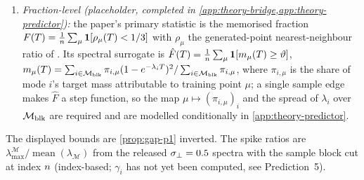 \begin{definition}
\begin{enumerate}
\item[(iii)] \emph{Fraction-level (placeholder, completed in \cref{app:theory-bridge,app:theory-predictor}):} the paper's primary statistic is the memorised fraction $F(T)=\tfrac1{n}\sum_\mu\mathbf 1[\rho_\mu(T)<1/3]$ with $\rho_\mu$ the generated-point nearest-neighbour ratio of \citet{bonnaire2025}. Its spectral surrogate is $\hat F(T)=\tfrac1{n}\sum_\mu\mathbf 1[m_\mu(T)\ge\vartheta]$, $m_\mu(T)=\sum_{i\in\mathcal M_{\rm blk}}\pi_{i,\mu}(1-e^{-\lambda_iT})^2/\sum_{i\in\mathcal M_{\rm blk}}\pi_{i,\mu}$, where $\pi_{i,\mu}$ is the share of mode $i$'s target mass attributable to training point $\mu$; a single sample edge makes $\hat F$ a step function, so the map $\mu\mapsto(\pi_{i,\mu})_i$ and the spread of $\lambda_i$ over $\mathcal M_{\rm blk}$ are required and are modelled conditionally in \cref{app:theory-predictor}.
\end{enumerate}
The displayed bounds are \cref{prop:gap-p1} inverted. The spike ratios are $\lambda^{\mathcal M}_{\max}/\operatorname{mean}(\lambda_{\mathcal M})$ from the released $\sigma_{\perp}=0.5$ spectra with the sample block cut at index $n$ (index-based; $\gamma_i$ has not yet been computed, see Prediction~5).
\end{definition}

